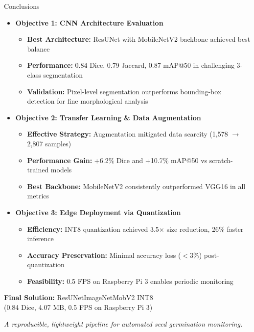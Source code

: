 \documentclass[aspectratio=169]{beamer}
\begin{document}
\begin{frame}{Conclusions}
    \begin{itemize}
        \item \textbf{Objective 1: CNN Architecture Evaluation}
                \small
                \begin{itemize}
                    \item \textbf{Best Architecture:} ResUNet with MobileNetV2 backbone achieved best balance
                    \item \textbf{Performance:} 0.84 Dice, 0.79 Jaccard, 0.87 mAP@50 in challenging 3-class segmentation
                    \item \textbf{Validation:} Pixel-level segmentation outperforms bounding-box detection for fine morphological analysis
                \end{itemize}
        
        \vspace{0.5em}
        \item \textbf{Objective 2: Transfer Learning \& Data Augmentation}
                \small
                \begin{itemize}
                    \item \textbf{Effective Strategy:} Augmentation mitigated data scarcity (1,578 $\rightarrow$ 2,807 samples)
                    \item \textbf{Performance Gain:} +6.2\% Dice and +10.7\% mAP@50 vs scratch-trained models
                    \item \textbf{Best Backbone:} MobileNetV2 consistently outperformed VGG16 in all metrics
                \end{itemize}
        
        \vspace{0.5em}
        \item \textbf{Objective 3: Edge Deployment via Quantization}
                \small
                \begin{itemize}
                    \item \textbf{Efficiency:} INT8 quantization achieved 3.5$\times$ size reduction, 26\% faster inference
                    \item \textbf{Accuracy Preservation:} Minimal accuracy loss ($<$3\%) post-quantization
                    \item \textbf{Feasibility:} 0.5 FPS on Raspberry Pi 3 enables periodic monitoring
                \end{itemize}
    \end{itemize}
    
    \vspace{1em}
    \centering
    \textbf{Final Solution:} ResUNetImageNetMobV2 INT8 \\
    \small (0.84 Dice, 4.07 MB, 0.5 FPS on Raspberry Pi 3)
    
    \vspace{0.5em}
    \footnotesize \textit{A reproducible, lightweight pipeline for automated seed germination monitoring.}
\end{frame}
\end{document}
